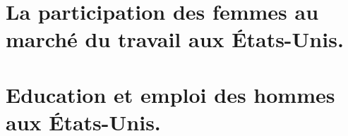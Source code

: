 \documentclass{article}[11pt]
\begin{document}
\tableofcontents
\listoftables
\listoffigures

\clearpage

\pagestyle{plain}

\section{La participation des femmes au marché du travail aux États-Unis.}



\clearpage

\section{Education et emploi des hommes aux États-Unis.}


\end{document}
